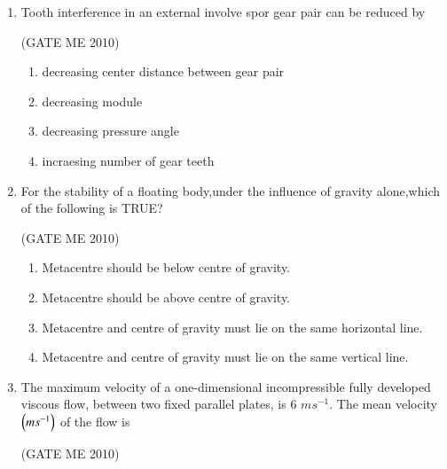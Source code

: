 \documentclass[journal,12pt,onecolumn]{IEEEtran}
\theoremstyle{remark}
\begin{document}
\begin{enumerate}
 \hfill{(GATE ME 2010)}\\

 
\begin{multicols}{4}
\begin{enumerate}
\item $\omega_{n}$
\item 0.408$\omega_{n}$
\item 0.204$\omega_{n}$
\item 0.167$\omega_{n}$
\end{enumerate}
\end{multicols}

\item Tooth interference in an external involve spor gear pair can be reduced by

 \hfill{(GATE ME 2010)}\\

\begin{enumerate}
\item decreasing center distance between gear pair
\item decreasing module 
\item decreasing pressure angle 
\item incraesing number of gear teeth
\end{enumerate}
 

\item For the stability of a floating body,under the influence of gravity alone,which of the following is TRUE?

  \hfill{(GATE ME 2010)}\\
  
    \begin{enumerate}
        \item Metacentre should be below centre of gravity.
\item Metacentre should be above centre of gravity.
\item Metacentre and centre of gravity must lie on the same horizontal line.
\item Metacentre and centre of gravity must lie on the same vertical line.
    \end{enumerate}
 


\item The maximum velocity of a one-dimensional incompressible fully developed viscous flow, between two fixed parallel plates, is 6 $ms^{-1}$. The mean velocity $\left(ms^{-1}\right)$ of the flow is

 \hfill{(GATE ME 2010)}\\


\end{enumerate}
\end{document}
